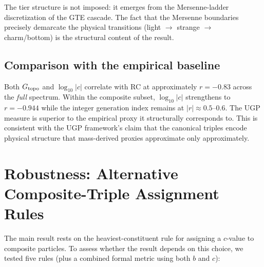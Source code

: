 \documentclass[12pt,a4paper]{article}
\begin{document}
The tier structure is not imposed: it emerges from the Mersenne-ladder
discretization of the GTE cascade.
The fact that the Mersenne boundaries precisely demarcate the physical
transitions (light $\to$ strange $\to$ charm/bottom) is the structural
content of the result.

\subsection{Comparison with the empirical baseline}

Both $G_{\rm topo}$ and $\log_{10}|c|$ correlate with RC at approximately
$r = -0.83$ across the \emph{full} spectrum.
Within the composite subset, $\log_{10}|c|$ strengthens to $r = -0.944$
while the integer generation index remains at $|r| \approx 0.5$--$0.6$.
The UGP measure is superior to the empirical proxy it structurally corresponds
to.
This is consistent with the UGP framework's claim that the canonical triples
encode physical structure that mass-derived proxies approximate only
approximately.

\section{Robustness: Alternative Composite-Triple Assignment Rules}
\label{sec:robustness}

The main result rests on the heaviest-constituent rule for assigning a
$c$-value to composite particles.
To assess whether the result depends on this choice, we tested five rules
(plus a combined formal metric using both $b$ and $c$):
\end{document}
